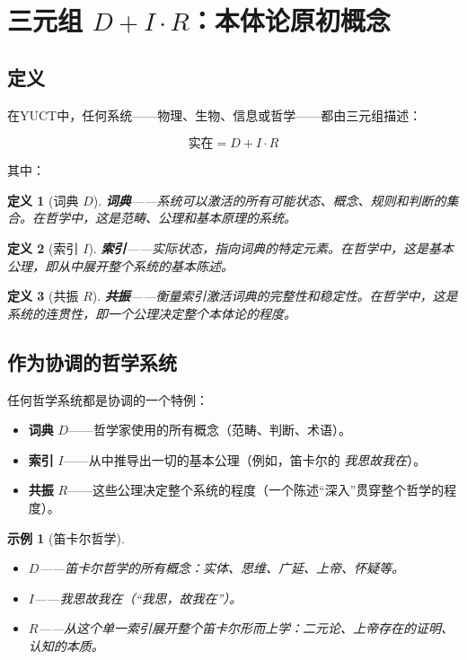 \documentclass[11pt,a4paper]{article}
\newtheorem{definition}{定义}[section]
\newtheorem{example}{示例}[section]
\begin{document}
	\section{三元组 \texorpdfstring{\(D + I \cdot R\)}{D + I * R}：本体论原初概念}
	
	\subsection{定义}
	
	在YUCT中，任何系统——物理、生物、信息或哲学——都由三元组描述：
	
	\begin{equation}
		\boxed{\text{实在} = D + I \cdot R}
	\end{equation}
	
	其中：
	
	\begin{definition}[词典 \(D\)]
		\textbf{词典}——系统可以激活的所有可能状态、概念、规则和判断的集合。在哲学中，这是范畴、公理和基本原理的系统。
	\end{definition}
	
	\begin{definition}[索引 \(I\)]
		\textbf{索引}——实际状态，指向词典的特定元素。在哲学中，这是基本公理，即从中展开整个系统的基本陈述。
	\end{definition}
	
	\begin{definition}[共振 \(R\)]
		\textbf{共振}——衡量索引激活词典的完整性和稳定性。在哲学中，这是系统的连贯性，即一个公理决定整个本体论的程度。
	\end{definition}
	
	\subsection{作为协调的哲学系统}
	
	任何哲学系统都是协调的一个特例：
	
	\begin{itemize}
		\item \textbf{词典} \(D\)——哲学家使用的所有概念（范畴、判断、术语）。
		\item \textbf{索引} \(I\)——从中推导出一切的基本公理（例如，笛卡尔的 \textit{我思故我在}）。
		\item \textbf{共振} \(R\)——这些公理决定整个系统的程度（一个陈述“深入”贯穿整个哲学的程度）。
	\end{itemize}
	
	\begin{example}[笛卡尔哲学]
		\begin{itemize}
			\item \(D\)——笛卡尔哲学的所有概念：实体、思维、广延、上帝、怀疑等。
			\item \(I\)——\textit{我思故我在}（“我思，故我在”）。
			\item \(R\)——从这个单一索引展开整个笛卡尔形而上学：二元论、上帝存在的证明、认知的本质。
		\end{itemize}
	\end{example}
	
\end{document}
